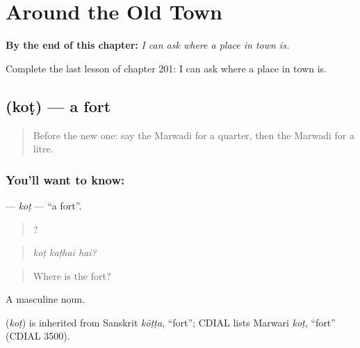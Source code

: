 
\chapter{Around the Old Town}
\label{ch:mw-around-the-old-town}

\begin{chapteropening}
\textbf{By the end of this chapter:} \emph{I can ask where a place in town is.}

Complete the last lesson of chapter 201: I can ask where a place in town is.
\end{chapteropening}

\section[\texorpdfstring{\mw{कोट} (koṭ)}{कोट (koṭ)}]{ (koṭ) — a fort}

\label{lesson:MW-C201-kot}



\begin{quote}
Before the new one: say the Marwadi for a quarter, then the Marwadi for a litre.
\end{quote}

\subsection*{You'll want to know: }
\textbf{} — \emph{koṭ} — \textquotedblleft{}a fort\textquotedblright{}.

\begin{quote}
  ?
\end{quote}

\begin{quote}
\emph{koṭ kaṭhai hai?}
\end{quote}

\begin{quote}
Where is the fort?
\end{quote}

A masculine noun.

\begin{cousinweb}
\textbf{} (\emph{koṭ}) is inherited from Sanskrit \emph{kōṭṭa}, \textquotedblleft{}fort\textquotedblright{}; CDIAL lists Marwari \emph{koṭ}, \textquotedblleft{}fort\textquotedblright{} (CDIAL 3500).
\end{cousinweb}

